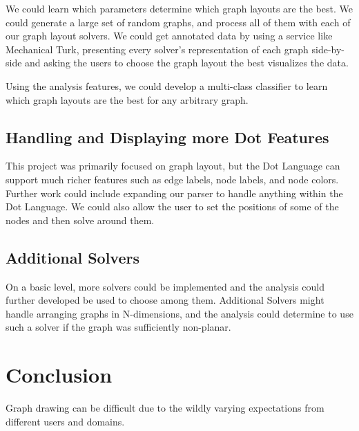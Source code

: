\documentclass{article}
\begin{document}
We could learn which parameters determine which graph layouts are the best. We could generate a large set of random graphs, and process all of them with each of our graph layout solvers. We could get annotated data by using a service like Mechanical Turk, presenting every solver's representation of each graph side-by-side and asking the users to choose the graph layout the best visualizes the data.

Using the analysis features, we could develop a multi-class classifier to learn which graph layouts are the best for any arbitrary graph.


\subsection{Handling and Displaying more Dot Features}
This project was primarily focused on graph layout, but the Dot Language can support much richer features such as edge labels, node labels, and node colors. Further work could include expanding our parser to handle anything within the Dot Language. We could also allow the user to set the positions of some of the nodes and then solve around them.


\subsection{Additional Solvers}
On a basic level, more solvers could be implemented and the analysis could further developed be used to choose among them. Additional Solvers might handle arranging graphs in N-dimensions, and the analysis could determine to use such a solver if the graph was sufficiently non-planar.



\section{Conclusion}
Graph drawing can be difficult due to the wildly varying expectations from different users and domains.





\end{document}
